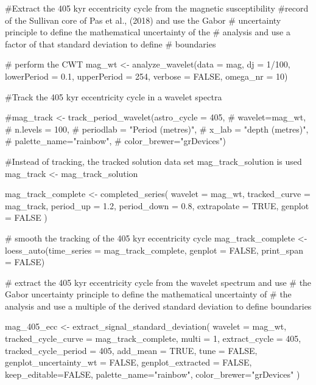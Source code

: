 \documentclass[a4paper]{book}
\begin{document}
\begin{Examples}
\begin{ExampleCode}

#Extract the 405 kyr eccentricity cycle from the magnetic susceptibility
#record of the Sullivan core of Pas et al., (2018) and use the Gabor
# uncertainty principle to define the mathematical uncertainty of the
# analysis and use a factor of that standard deviation to define
# boundaries

# perform the CWT
mag_wt <- analyze_wavelet(data = mag,
dj = 1/100,
lowerPeriod = 0.1,
upperPeriod = 254,
verbose = FALSE,
omega_nr = 10)

#Track the 405 kyr eccentricity cycle in a wavelet spectra

#mag_track <- track_period_wavelet(astro_cycle = 405,
#                                   wavelet=mag_wt,
#                                   n.levels = 100,
#                                   periodlab = "Period (metres)",
#                                   x_lab = "depth (metres)",
#                                   palette_name="rainbow",
#                                   color_brewer="grDevices")

#Instead of tracking, the tracked solution data set mag_track_solution is used
mag_track <- mag_track_solution

mag_track_complete <- completed_series(
  wavelet = mag_wt,
  tracked_curve = mag_track,
  period_up = 1.2,
  period_down = 0.8,
  extrapolate = TRUE,
  genplot = FALSE
)

# smooth the tracking of the 405 kyr eccentricity cycle
mag_track_complete <- loess_auto(time_series = mag_track_complete,
genplot = FALSE, print_span = FALSE)

# extract the 405 kyr eccentricity cycle from the wavelet spectrum and use
# the Gabor uncertainty principle to define the mathematical uncertainty of
# the analysis and use a multiple of the derived standard deviation to define boundaries

mag_405_ecc <- extract_signal_standard_deviation(
wavelet = mag_wt,
tracked_cycle_curve = mag_track_complete,
multi = 1,
extract_cycle = 405,
tracked_cycle_period = 405,
add_mean = TRUE,
tune = FALSE,
genplot_uncertainty_wt = FALSE,
genplot_extracted = FALSE,
keep_editable=FALSE,
palette_name="rainbow",
color_brewer="grDevices"
)

\end{ExampleCode}
\end{Examples}
\end{document}
